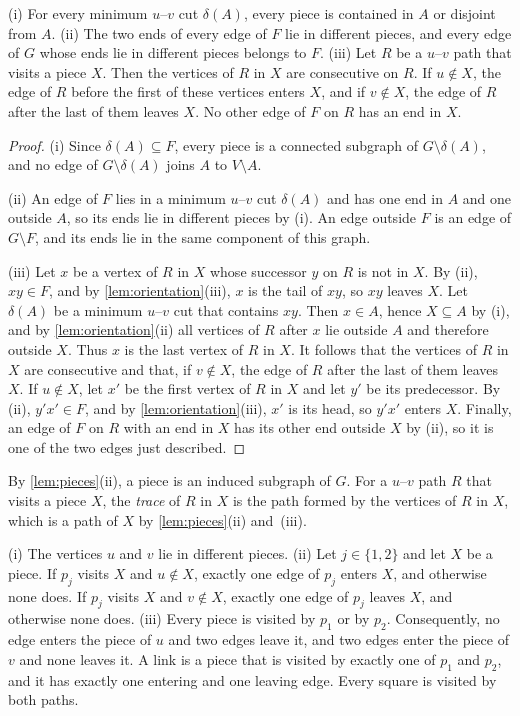 \begin{lemma}
\label{lem:pieces}
(i) For every minimum $u$--$v$ cut $\delta(A)$, every piece is contained in $A$ or disjoint from $A$.
(ii) The two ends of every edge of $F$ lie in different pieces, and every edge of $G$ whose ends lie in different pieces belongs to $F$.
(iii) Let $R$ be a $u$--$v$ path that visits a piece $X$.
Then the vertices of $R$ in $X$ are consecutive on $R$.
If $u \notin X$, the edge of $R$ before the first of these vertices enters $X$, and if $v \notin X$, the edge of $R$ after the last of them leaves $X$.
No other edge of $F$ on $R$ has an end in $X$.
\end{lemma}

\begin{proof}
(i) Since $\delta(A) \subseteq F$, every piece is a connected subgraph of $G \setminus \delta(A)$, and no edge of $G \setminus \delta(A)$ joins $A$ to $V \setminus A$.

(ii) An edge of $F$ lies in a minimum $u$--$v$ cut $\delta(A)$ and has one end in $A$ and one outside $A$, so its ends lie in different pieces by (i).
An edge outside $F$ is an edge of $G \setminus F$, and its ends lie in the same component of this graph.

(iii) Let $x$ be a vertex of $R$ in $X$ whose successor $y$ on $R$ is not in $X$.
By (ii), $xy \in F$, and by \cref{lem:orientation}(iii), $x$ is the tail of $xy$, so $xy$ leaves $X$.
Let $\delta(A)$ be a minimum $u$--$v$ cut that contains $xy$.
Then $x \in A$, hence $X \subseteq A$ by (i), and by \cref{lem:orientation}(ii) all vertices of $R$ after $x$ lie outside $A$ and therefore outside $X$.
Thus $x$ is the last vertex of $R$ in $X$.
It follows that the vertices of $R$ in $X$ are consecutive and that, if $v \notin X$, the edge of $R$ after the last of them leaves $X$.
If $u \notin X$, let $x'$ be the first vertex of $R$ in $X$ and let $y'$ be its predecessor.
By (ii), $y'x' \in F$, and by \cref{lem:orientation}(iii), $x'$ is its head, so $y'x'$ enters $X$.
Finally, an edge of $F$ on $R$ with an end in $X$ has its other end outside $X$ by (ii), so it is one of the two edges just described.
\end{proof}

By \cref{lem:pieces}(ii), a piece is an induced subgraph of $G$.
For a $u$--$v$ path $R$ that visits a piece $X$, the \emph{trace} of $R$ in $X$ is the path formed by the vertices of $R$ in $X$, which is a path of $X$ by \cref{lem:pieces}(ii) and~(iii).

\begin{lemma}
\label{lem:degrees}
(i) The vertices $u$ and $v$ lie in different pieces.
(ii) Let $j \in \{1, 2\}$ and let $X$ be a piece.
If $p_j$ visits $X$ and $u \notin X$, exactly one edge of $p_j$ enters $X$, and otherwise none does.
If $p_j$ visits $X$ and $v \notin X$, exactly one edge of $p_j$ leaves $X$, and otherwise none does.
(iii) Every piece is visited by $p_1$ or by $p_2$.
Consequently, no edge enters the piece of $u$ and two edges leave it, and two edges enter the piece of $v$ and none leaves it.
A link is a piece that is visited by exactly one of $p_1$ and $p_2$, and it has exactly one entering and one leaving edge.
Every square is visited by both paths.
\end{lemma}

